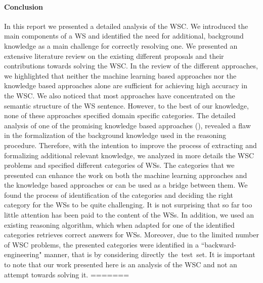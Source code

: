 
\paragraph{Conclusion}
In this report we presented a detailed analysis of the WSC. We introduced the main components of a WS and identified the need for  additional, background knowledge as a main challenge for correctly resolving one. We presented an extensive literature review on the existing different proposals and their contributions towards solving the WSC. In the review of the different approaches, we highlighted that neither the machine learning based approaches nor the knowledge based approaches alone are sufficient for achieving high accuracy in the WSC. We also noticed that most approaches have concentrated on the semantic structure of the WS sentence. However, to the best of our knowledge, none of these approaches specified domain specific categories. The detailed analysis of one of the promising knowledge based approaches (\cite{2018CommonsenseKT}), revealed a flaw in the formalization of the background knowledge used in the reasoning procedure. Therefore, with the intention to improve the process of extracting and formalizing additional relevant knowledge, we analyzed in more details the WSC problems and specified different categories of WSs. The categories that we presented can enhance the work on both the machine learning approaches and the knowledge based approaches or can be used as a bridge between them. We found the process of identification of the categories and deciding the right category for the WSs to be quite challenging. It is not surprising that so far too little attention has been paid to the content of the WSs. In addition, we used an existing reasoning algorithm, which when adapted for one of the identified categories retrieves correct answers for WSs. 
Moreover, due to the limited number of WSC problems, the presented categories were identified in a ``backward-engineering" manner, that is by considering directly~the~test~set. It is important to note that our work presented here is an analysis of the WSC and not an attempt towards solving it.
=======
